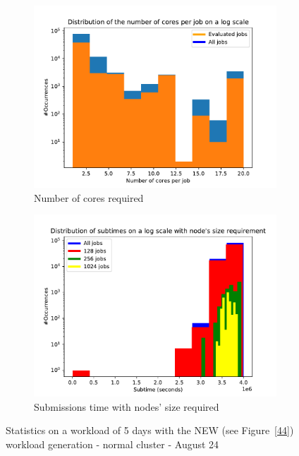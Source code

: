 \documentclass[a4paper]{article}
\begin{document}
\begin{figure}[H]
\begin{subfigure}[b]{0.4\linewidth}\centering\includegraphics[width=1\linewidth]{MBSS/plot/Distribution/2022-01-17->2022-01-19_cores.pdf}\caption{Number of cores required}\label{41}\end{subfigure}
\begin{subfigure}[b]{0.4\linewidth}\centering\includegraphics[width=1\linewidth]{MBSS/plot/Distribution/2022-01-17->2022-01-19_subtime_with_nodes_size.pdf}\caption{Submissions time with nodes' size required}\label{42}\end{subfigure}
\caption{Statistics on a workload of 5 days with the NEW (see Figure~\ref{44}) workload generation - normal cluster - August 24}\label{43}\end{figure}
\end{document}
